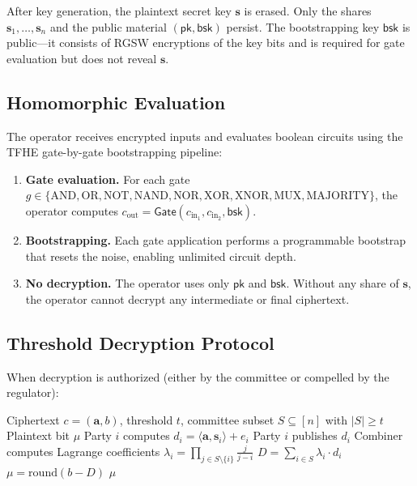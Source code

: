 \documentclass[11pt,a4paper]{article}
\begin{document}
After key generation, the plaintext secret key $\mathbf{s}$ is erased.
Only the shares $\mathbf{s}_1, \ldots, \mathbf{s}_n$ and the public
material $(\mathsf{pk}, \mathsf{bsk})$ persist.  The bootstrapping key
$\mathsf{bsk}$ is public---it consists of RGSW encryptions of the key
bits and is required for gate evaluation but does not reveal
$\mathbf{s}$.

\subsection{Homomorphic Evaluation}

The operator receives encrypted inputs and evaluates boolean circuits
using the TFHE gate-by-gate bootstrapping pipeline:

\begin{enumerate}[nosep]
  \item \textbf{Gate evaluation.}  For each gate $g \in \{\text{AND},
        \text{OR}, \text{NOT}, \text{NAND}, \text{NOR}, \text{XOR},
        \text{XNOR}, \text{MUX}, \text{MAJORITY}\}$, the operator
        computes $c_{\text{out}} = \mathsf{Gate}(c_{\text{in}_1},
        c_{\text{in}_2}, \mathsf{bsk})$.
  \item \textbf{Bootstrapping.}  Each gate application performs a
        programmable bootstrap that resets the noise, enabling
        unlimited circuit depth.
  \item \textbf{No decryption.}  The operator uses only
        $\mathsf{pk}$ and $\mathsf{bsk}$.  Without any share of
        $\mathbf{s}$, the operator cannot decrypt any intermediate
        or final ciphertext.
\end{enumerate}

\subsection{Threshold Decryption Protocol}

When decryption is authorized (either by the committee or compelled by
the regulator):

\begin{algorithm}[H]
\caption{Threshold Decryption}
\label{alg:decrypt}
\begin{algorithmic}[1]
\Require Ciphertext $c = (\mathbf{a}, b)$, threshold $t$, committee
         subset $S \subseteq [n]$ with $|S| \geq t$
\Ensure Plaintext bit $\mu$
  \State Party $i$ computes $d_i = \langle \mathbf{a}, \mathbf{s}_i
         \rangle + e_i$ 
  \State Party $i$ publishes $d_i$
\EndFor
\State Combiner computes Lagrange coefficients
       $\lambda_i = \prod_{j \in S \setminus \{i\}} \frac{j}{j - i}$
\State $D = \sum_{i \in S} \lambda_i \cdot d_i$
\State $\mu = \text{round}(b - D)$
\State \Return $\mu$
\end{algorithmic}
\end{algorithm}
\end{document}
